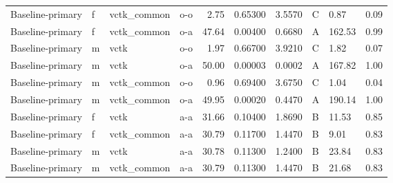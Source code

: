\begin{tabular}{llllrrrlll}
     Baseline-primary &      f &  vctk\_common &  o-o &           2.75 &                 0.65300 &            3.5570 &              C &    0.87 &     0.09 \\
     Baseline-primary &      f &  vctk\_common &  o-a &          47.64 &                 0.00400 &            0.6680 &              A &  162.53 &     0.99 \\
     Baseline-primary &      m &         vctk &  o-o &           1.97 &                 0.66700 &            3.9210 &              C &    1.82 &     0.07 \\
     Baseline-primary &      m &         vctk &  o-a &          50.00 &                 0.00003 &            0.0002 &              A &  167.82 &     1.00 \\
     Baseline-primary &      m &  vctk\_common &  o-o &           0.96 &                 0.69400 &            3.6750 &              C &    1.04 &     0.04 \\
     Baseline-primary &      m &  vctk\_common &  o-a &          49.95 &                 0.00020 &            0.4470 &              A &  190.14 &     1.00 \\
     Baseline-primary &      f &         vctk &  a-a &          31.66 &                 0.10400 &            1.8690 &              B &   11.53 &     0.85 \\
     Baseline-primary &      f &  vctk\_common &  a-a &          30.79 &                 0.11700 &            1.4470 &              B &    9.01 &     0.83 \\
     Baseline-primary &      m &         vctk &  a-a &          30.78 &                 0.11300 &            1.2400 &              B &   23.84 &     0.83 \\
     Baseline-primary &      m &  vctk\_common &  a-a &          30.79 &                 0.11300 &            1.4470 &              B &   21.68 &     0.83 \\
\bottomrule
\end{tabular}
